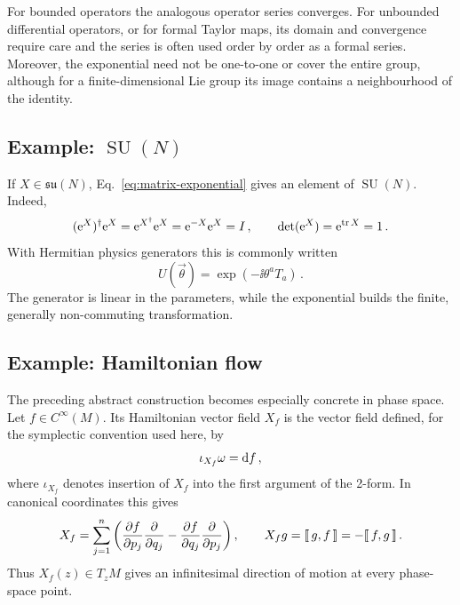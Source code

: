 For bounded operators the analogous operator series converges.  For
unbounded differential operators, or for formal Taylor maps, its domain and
convergence require care and the series is often used order by order as a
formal series.  Moreover, the exponential need not be one-to-one or cover
the entire group, although for a finite-dimensional Lie group its image
contains a neighbourhood of the identity.


\subsection{Example: \texorpdfstring{$\operatorname{SU}(N)$}{SU(N)}}

If $X\in\mathfrak{su}(N)$, Eq.~\eqref{eq:matrix-exponential} gives an
element of $\operatorname{SU}(N)$.  Indeed,
\begin{equation}
    (\mathrm{e}^X)^\dagger\mathrm{e}^X = \mathrm{e}^{X^\dagger}\mathrm{e}^X = \mathrm{e}^{-X}\mathrm{e}^X = I\,,
    \qquad
    \det(\mathrm{e}^X) = \mathrm{e}^{\operatorname{tr} X} = 1\,.
\end{equation}
With Hermitian physics generators this is commonly written
\begin{equation}
    U(\vec\theta) = \exp(-\ii\theta^aT_a)\,.
\end{equation}
The generator is linear in the parameters, while the exponential builds the
finite, generally non-commuting transformation.


\subsection{Example: Hamiltonian flow}

The preceding abstract construction becomes especially concrete in phase
space.  Let $f\in C^\infty(M)$.  Its Hamiltonian vector field $X_f$ is the
vector field defined, for the symplectic convention used here, by
\begin{equation}\label{eq:hamiltonian-vector-field-geometric}
    \iota_{X_f}\omega = \text{d} f\,,
\end{equation}
where $\iota_{X_f}$ denotes insertion of $X_f$ into the first argument of the
2-form.  In canonical coordinates this gives
\begin{equation}\label{eq:hamiltonian-vector-field}
    X_f = \sum_{j = 1}^{n}\left(
    \frac{\partial {f}}{\partial {p_j}}\frac{\partial {}}{\partial {q_j}}
    -\frac{\partial {f}}{\partial {q_j}}\frac{\partial {}}{\partial {p_j}}
    \right),
    \qquad
    X_f g = \llbracket \, g,f\,\rrbracket = -\llbracket \, f,g\,\rrbracket\,.
\end{equation}
Thus $X_f(z)\in T_zM$ gives an infinitesimal direction of motion at every
phase-space point.

